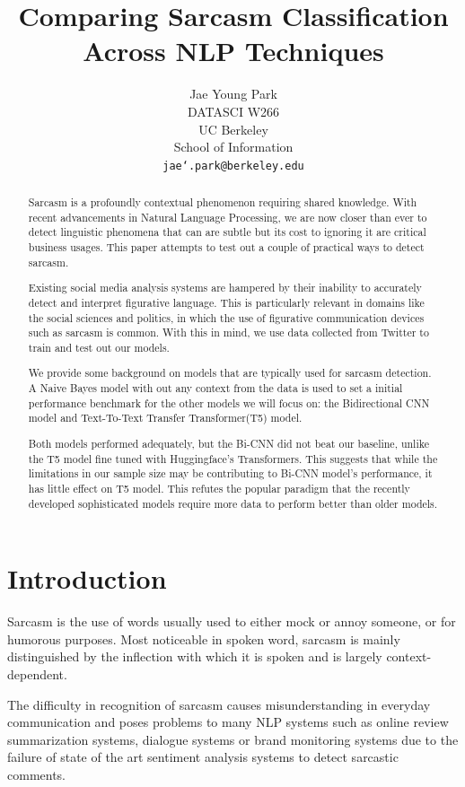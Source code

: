 \documentclass[11pt,a4paper]{article}
\title{Comparing Sarcasm Classification Across NLP Techniques}
\author{Jae Young Park \\
  DATASCI W266\\
  UC Berkeley \\
  School of Information \\
  {\tt jae\char`.park@berkeley.edu} \\}
\date{}
\begin{document}
\maketitle
\begin{abstract}
Sarcasm is a profoundly contextual phenomenon requiring shared knowledge. With recent advancements in Natural Language Processing, we are now closer than ever to detect linguistic phenomena that can are subtle but its cost to ignoring it are critical business usages. This paper attempts to test out a couple of practical ways to detect sarcasm.

Existing social media analysis systems are hampered by their inability to accurately detect and interpret figurative language. This is particularly relevant in domains like the social sciences and politics, in which the use of figurative communication devices such as sarcasm is common. With this in mind, we use data collected from Twitter to train and test out our models.

We provide some background on models that are typically used for sarcasm detection. A Naive Bayes model with out any context from the data is used to set a initial performance benchmark for the other models we will focus on: the Bidirectional CNN model and Text-To-Text Transfer Transformer(T5) model. 

Both models performed adequately, but the Bi-CNN did not beat our baseline, unlike the T5 model fine tuned with Huggingface's Transformers. This suggests that while the limitations in our sample size may be contributing to Bi-CNN model's performance, it has little effect on T5 model. This refutes the popular paradigm that the recently developed sophisticated models require more data to perform better than older models.

\end{abstract}

\section{Introduction}

Sarcasm is the use of words usually used to either mock or annoy someone, or for humorous purposes. Most noticeable in spoken word, sarcasm is mainly distinguished by the inflection with which it is spoken and is largely context-dependent.

The difficulty in recognition of sarcasm causes misunderstanding in everyday communication and poses problems to many NLP systems such as online review summarization systems, dialogue systems
or brand monitoring systems due to the failure of state of the art sentiment analysis systems to detect sarcastic comments.
\end{document}

